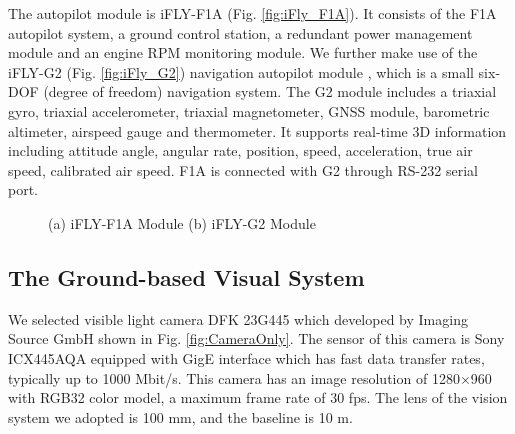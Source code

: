 The autopilot module is iFLY-F1A (Fig. \ref{fig:iFly_F1A}). It consists of the F1A autopilot system, a ground control station, a redundant power management module and an engine RPM monitoring module. We further make use of the iFLY-G2 (Fig. \ref{fig:iFly_G2}) navigation autopilot module \cite{IFLY}, which is a small six-DOF (degree of freedom) navigation system. The G2 module includes a triaxial gyro, triaxial accelerometer, triaxial magnetometer, GNSS module, barometric altimeter, airspeed gauge and thermometer. It supports real-time 3D information including attitude angle, angular rate, position, speed, acceleration, true air speed, calibrated air speed. F1A is connected with G2 through RS-232 serial port.

\begin{figure}[!tb]
	\centering
	
	\caption{(a) iFLY-F1A Module   (b) iFLY-G2 Module}
\end{figure}


\subsection{The Ground-based Visual System}

We selected visible light camera DFK 23G445 which developed by Imaging Source GmbH shown in Fig. \ref{fig:CameraOnly}. The sensor of this camera is Sony ICX445AQA equipped with GigE interface which has fast data transfer rates, typically up to 1000 Mbit/s. This camera has an image resolution of 1280$\times$960 with RGB32 color model, a maximum frame rate of 30 fps. The lens of the vision system we adopted is 100 mm, and the baseline is 10 m.

